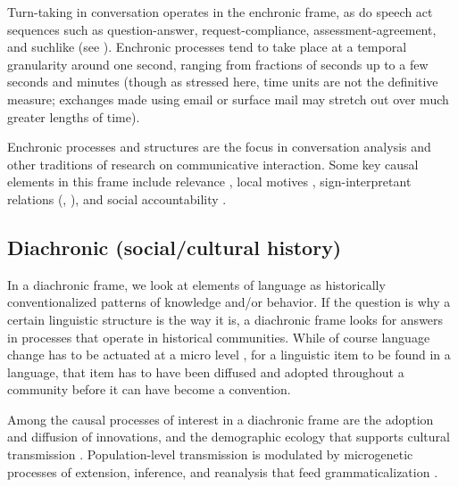 Turn-taking in conversation operates in the enchronic 
frame, as do speech act sequences such as question-answer, 
request-compliance, assessment-agreement, and suchlike (see \citealt{enfield_language_2014}). Enchronic processes tend to take place at a temporal 
granularity around one second, ranging from fractions of seconds up to 
a few seconds and minutes (though as stressed here, time units are not 
the definitive measure; exchanges made using email or surface mail may stretch out over much greater lengths of time). 



Enchronic processes and structures are the focus in 
conversation analysis and other traditions of research on communicative 
interaction. Some key causal elements in this frame include relevance \citep{garfinkel_studies_1967,grice_logic_1975,dan_sperber_relevance:_1995}, local motives \citep{schutz_phenomenology_1970,leontev_problems_1981,heritage_garfinkel_1984}, sign-interpretant relations (\citealt{kockelman_semiotic_2005,kockelman_agent_2013}, \citealt[Chapter 4]{enfield_relationship_2013}), and social accountability \citep{garfinkel_studies_1967,heritage_garfinkel_1984}.



\subsection{Diachronic (social/cultural history)}


In a diachronic frame, we look at elements of language as historically 
conventionalized patterns of knowledge and/or behavior. If the question 
is why a certain linguistic structure is the way it is, a diachronic 
frame looks for answers in processes that operate in historical 
communities. While of course language change has to be actuated at a 
micro level \citep{weinreich_empirical_1968,labov_mechanism_1986,eckert_linguistic_2000}, for a linguistic item to be found in a language, that 
item has to have been diffused and adopted throughout a community 
before it can have become a convention. 



Among the causal processes of interest in a diachronic frame are the 
adoption and diffusion of innovations, and the demographic ecology that 
supports cultural transmission \citep{rogers_diffusion_2003}. Population-level 
transmission is modulated by microgenetic processes of extension, inference, and reanalysis that feed grammaticalization 
\citep{hopper_grammaticalization_1993}. 



